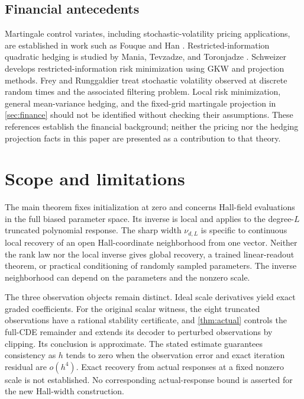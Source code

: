 \documentclass[11pt,a4paper]{article}
\numberwithin{equation}{section}
\theoremstyle{definition}
\theoremstyle{remark}
\begin{document}
\subsection{Financial antecedents}
Martingale control variates, including stochastic-volatility pricing
applications, are established in work such as Fouque and Han
\cite{FouqueHan}. Restricted-information quadratic hedging is studied by
Mania, Tevzadze, and Toronjadze \cite{Mania}. Schweizer \cite{Schweizer}
develops restricted-information risk minimization using GKW and projection
methods. Frey and Runggaldier \cite{FreyRunggaldier} treat stochastic
volatility observed at discrete random times and the associated filtering
problem. Local risk minimization, general mean-variance hedging, and the
fixed-grid martingale projection in \cref{sec:finance} should not be
identified without checking their assumptions. These references establish
the financial background; neither the pricing nor the hedging projection
facts in this paper are presented as a contribution to that theory.

\section{Scope and limitations}
\label{sec:limitations}
The main theorem fixes initialization at zero and concerns Hall-field
evaluations in the full biased parameter space. Its inverse is local
and applies to the degree-$L$ truncated polynomial response.
The sharp width $\nu_{d,L}$ is specific to continuous local recovery
of an open Hall-coordinate neighborhood from one vector.
Neither the rank law nor the local inverse gives global recovery,
a trained linear-readout theorem, or practical conditioning of randomly
sampled parameters. The inverse neighborhood can depend on the
parameters and the nonzero scale.

The three observation objects remain distinct. Ideal scale derivatives
yield exact graded coefficients. For the original scalar witness,
the eight truncated observations have a rational stability certificate,
and \cref{thm:actual} controls the full-CDE remainder and extends its
decoder to perturbed observations by clipping. Its conclusion is
approximate. The stated estimate guarantees consistency as $h$ tends to
zero when the observation error and exact iteration residual are $o(h^4)$.
Exact recovery from actual
responses at a fixed nonzero scale is not established. No corresponding
actual-response bound is asserted for the new Hall-width construction.
\end{document}

